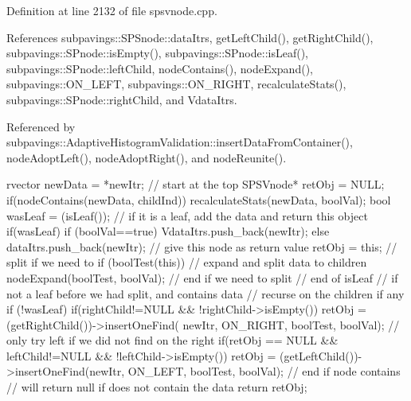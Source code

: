 \-Definition at line 2132 of file spsvnode.\-cpp.



\-References subpavings\-::\-S\-P\-Snode\-::data\-Itrs, get\-Left\-Child(), get\-Right\-Child(), subpavings\-::\-S\-Pnode\-::is\-Empty(), subpavings\-::\-S\-Pnode\-::is\-Leaf(), subpavings\-::\-S\-Pnode\-::left\-Child, node\-Contains(), node\-Expand(), subpavings\-::\-O\-N\-\_\-\-L\-E\-F\-T, subpavings\-::\-O\-N\-\_\-\-R\-I\-G\-H\-T, recalculate\-Stats(), subpavings\-::\-S\-Pnode\-::right\-Child, and \-Vdata\-Itrs.



\-Referenced by subpavings\-::\-Adaptive\-Histogram\-Validation\-::insert\-Data\-From\-Container(), node\-Adopt\-Left(), node\-Adopt\-Right(), and node\-Reunite().


\begin{DoxyCode}
   {
      rvector newData = *newItr;
      // start at the top
      SPSVnode* retObj = NULL;
      if(nodeContains(newData, childInd)) {
            recalculateStats(newData, boolVal);
            bool wasLeaf = (isLeaf());
            // if it is a leaf, add the data and return this object
            if(wasLeaf) { 
                if (boolVal==true) {
                   VdataItrs.push_back(newItr);
                }
                else {
                     dataItrs.push_back(newItr);
                }            
                // give this node as return value
                retObj = this;
                // split if we need to
                if (boolTest(this)) {
                    // expand and split data to children
                    nodeExpand(boolTest, boolVal);
                } // end if we need to split
            } // end of isLeaf
            // if not a leaf before we had split, and contains data
            // recurse on the children if any
            if (!wasLeaf) {
               if(rightChild!=NULL && !rightChild->isEmpty()){
                    retObj =
                    (getRightChild())->insertOneFind(
                        newItr, ON_RIGHT, boolTest, boolVal);
               }
               // only try left if we did not find on the right
               if(retObj == NULL && leftChild!=NULL &&
                                    !leftChild->isEmpty()) {
                    retObj =
                    (getLeftChild())->insertOneFind(newItr,
                    ON_LEFT, boolTest, boolVal);
               }
            }
         } // end if node contains
        // will return null if does not contain the data
        return retObj;
      }
\end{DoxyCode}
